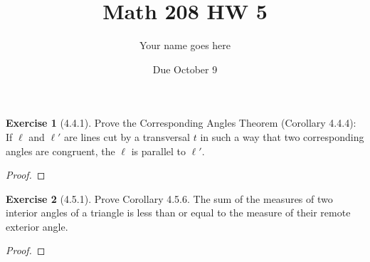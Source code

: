 \documentclass[12pt]{article}		%
\title{Math 208 HW 5}
\author{Your name goes here}
\date{Due October 9}
\theoremstyle{definition}
\newtheorem*{ex}{Exercise}
\begin{document}
	\maketitle
	
	


\begin{ex}[4.4.1]  Prove the Corresponding Angles Theorem (Corollary 4.4.4): If $\ell$ and $\ell'$ are lines cut by a transversal $t$ in such a way that two corresponding angles are congruent, the $\ell$ is parallel to $\ell'$.
	
\end{ex}

\begin{proof} 
	
\end{proof}



\vspace{1in} %



\begin{ex}[4.5.1] Prove Corollary 4.5.6.  The sum of the measures of two interior angles of a triangle is less than or equal to the measure of their remote exterior angle.
	
\end{ex}

\begin{proof} 
	
\end{proof}



\vspace{1in} %




	
	
	
\end{document}

